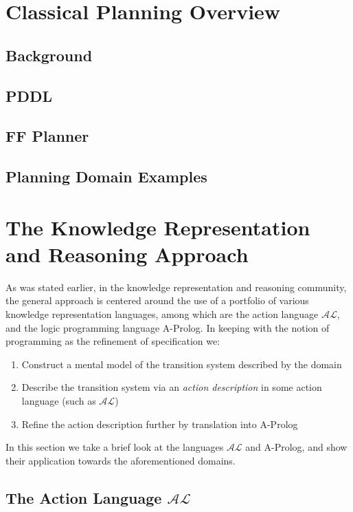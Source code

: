 \documentclass{article}
\newcommand{\AL}{\ensuremath{\mathcal{AL}}}
\begin{document}
\section{Classical Planning Overview}
\subsection{Background}


\subsection{PDDL}


\subsection{FF Planner}


\subsection{Planning Domain Examples}\label{sub:planning_domain_examples}


\section{The Knowledge Representation and Reasoning Approach}

As was stated earlier, in the knowledge representation and reasoning community, the general approach is centered around the use of a portfolio of various knowledge representation languages, among which are the action language $\AL$, and the logic programming language A-Prolog. In keeping with the notion of programming as the refinement of specification we:
\begin{enumerate}
    \item Construct a mental model of the transition system described by the domain
    \item Describe the transition system via an \emph{action description} in some action language (such as $\AL$)
    \item Refine the action description further by translation into A-Prolog
\end{enumerate}
In this section we take a brief look at the languages $\AL$ and A-Prolog, and show their application towards the aforementioned domains.

\subsection{The Action Language $\AL$}
\end{document}
